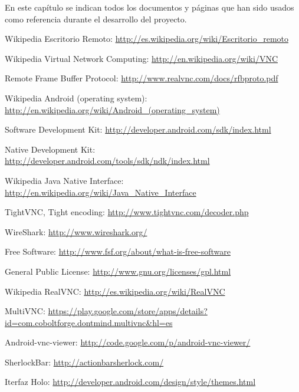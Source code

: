 En este capítulo se indican todos los documentos y páginas que han sido usados como referencia durante el desarrollo del proyecto.

\begin{thebibliography}{11}

Wikipedia Escritorio Remoto: \url{http://es.wikipedia.org/wiki/Escritorio_remoto}

Wikipedia Virtual Network Computing: \url{http://en.wikipedia.org/wiki/VNC}

Remote Frame Buffer Protocol: \url{http://www.realvnc.com/docs/rfbproto.pdf}

Wikipedia Android (operating system): \url{http://en.wikipedia.org/wiki/Android_(operating_system)}

Software Development Kit:  \url{http://developer.android.com/sdk/index.html}

Native Development Kit: \url{http://developer.android.com/tools/sdk/ndk/index.html}

Wikipedia Java Native Interface: \url{http://en.wikipedia.org/wiki/Java_Native_Interface}

TightVNC, Tight encoding: \url{http://www.tightvnc.com/decoder.php}

WireShark: \url{http://www.wireshark.org/}

Free Software: \url{http://www.fsf.org/about/what-is-free-software}

General Public License: \url{http://www.gnu.org/licenses/gpl.html}

Wikipedia RealVNC: \url{http://es.wikipedia.org/wiki/RealVNC}

MultiVNC: \url{https://play.google.com/store/apps/details?id=com.coboltforge.dontmind.multivnc&hl=es}

Android-vnc-viewer: \url{http://code.google.com/p/android-vnc-viewer/}

SherlockBar: \url{http://actionbarsherlock.com/}

Iterfaz Holo: \url{http://developer.android.com/design/style/themes.html}

\end{thebibliography}
